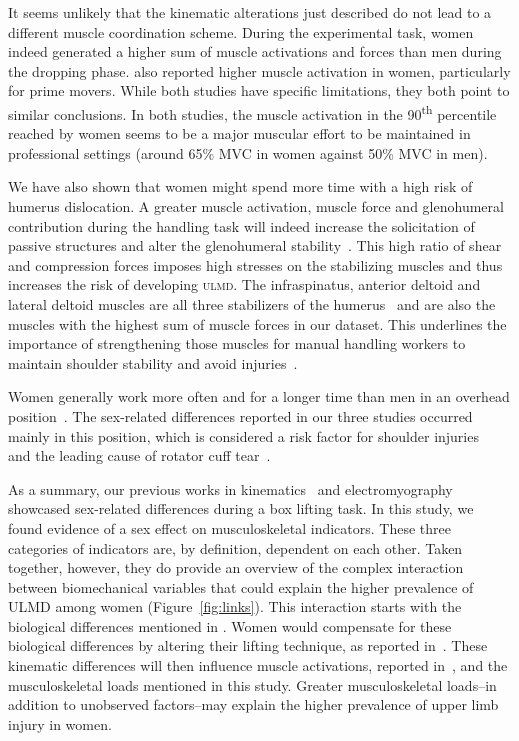 It seems unlikely that the kinematic alterations just described do not lead to a different muscle coordination scheme.
During the experimental task, women indeed generated a higher sum of muscle activations and forces than men during the dropping phase.
\citet{Bouffard2019-fd} also reported higher muscle activation in women, particularly for prime movers.
While both studies have specific limitations, they both point to similar conclusions.
In both studies, the muscle activation in the 90\textsuperscript{th} percentile reached by women seems to be a major muscular effort to be maintained in professional settings (around 65\% MVC in women against 50\% MVC in men).

We have also shown that women might spend more time with a high risk of humerus dislocation.
A greater muscle activation, muscle force and glenohumeral contribution during the handling task will indeed increase the solicitation of passive structures and alter the glenohumeral stability~\cite{Bergmann2007-zj}.
This high ratio of shear and compression forces imposes high stresses on the stabilizing muscles and thus increases the risk of developing \textsc{ulmd}.
The infraspinatus, anterior deltoid and lateral deltoid muscles are all three stabilizers of the humerus~\cite{Blache2017-pv, Yanagawa2008-es} and are also the muscles with the highest sum of muscle forces in our dataset.
This underlines the importance of strengthening those muscles for manual handling workers to maintain shoulder stability and avoid injuries~\cite{Sharkey1995-gl}.

Women generally work more often and for a longer time than men in an overhead position~\cite{Dahlberg2004-mw}.
The sex-related differences reported in our three studies occurred mainly in this position, which is considered a risk factor for shoulder injuries~\cite{Antony2010-ji, Dal_Maso2016-ol, Grieve2008-je} and the leading cause of rotator cuff tear~\cite{Palmerud2000-mp, Vecchio1995-ke}.

As a summary, our previous works in kinematics~\cite{Martinez2019-mm} and electromyography~\cite{Bouffard2019-fd} showcased sex-related differences during a box lifting task.
In this study, we found evidence of a sex effect on musculoskeletal indicators.
These three categories of indicators are, by definition, dependent on each other.
Taken together, however, they do provide an overview of the complex interaction between biomechanical variables that could explain the higher prevalence of ULMD among women (Figure~\ref{fig:links}).
This interaction starts with the biological differences mentioned in \citet{Cote2012-hn}.
Women would compensate for these biological differences by altering their lifting technique, as reported in~\cite{Martinez2019-mm}.
These kinematic differences will then influence muscle activations, reported in~\cite{Bouffard2019-fd}, and the musculoskeletal loads mentioned in this study.
Greater musculoskeletal loads--in addition to unobserved factors--may explain the higher prevalence of upper limb injury in women.

